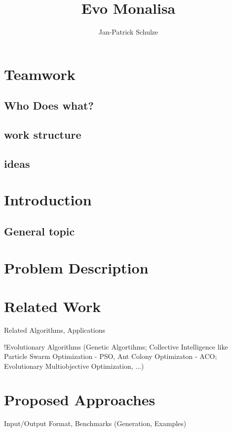 \documentclass[10pt,a4paper]{article}
\author{Jan-Patrick Schulze}
\title{Evo Monalisa}
\begin{document}
\maketitle
\tableofcontents
\newpage

\section{Teamwork}
\subsection{Who Does what?}



\subsection{work structure}
\subsection{ideas}



\section{Introduction}
\subsection{General topic}

\section{Problem Description}

\section{Related Work}

Related Algorithms, Applications

!Evolutionary Algorithms (Genetic Algortihms; Collective Intelligence like Particle Swarm Optimization - PSO, Ant Colony Optimizaton - ACO; Evolutionary Multiobjective Optimization, ...)


\section{Proposed Approaches}

Input/Output Format, Benchmarks (Generation, Examples)
\end{document}
